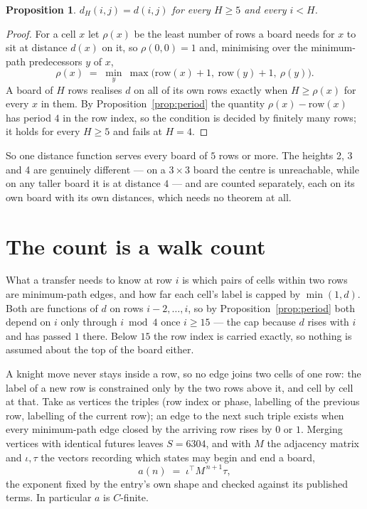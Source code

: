 \documentclass[11pt,a4paper]{article}
\theoremstyle{plain}
\newtheorem{proposition}[theorem]{Proposition}
\theoremstyle{definition}
\begin{document}
\begin{proposition}\label{prop:height}
$d_H(i,j)=d(i,j)$ for every $H\ge5$ and every $i<H$.
\end{proposition}

\begin{proof}
For a cell $x$ let $\rho(x)$ be the least number of rows a board needs for $x$ to sit at distance $d(x)$ on it, so $\rho(0,0)=1$ and, minimising over the minimum-path predecessors $y$ of $x$,
\[ \rho(x)\;=\;\min_y\ \max\bigl(\mathrm{row}(x)+1,\ \mathrm{row}(y)+1,\ \rho(y)\bigr). \]
A board of $H$ rows realises $d$ on all of its own rows exactly when $H\ge\rho(x)$ for every $x$ in them. By Proposition~\ref{prop:period} the quantity $\rho(x)-\mathrm{row}(x)$ has period $4$ in the row index, so the condition is decided by finitely many rows; it holds for every $H\ge5$ and fails at $H=4$.
\end{proof}

So one distance function serves every board of $5$ rows or more. The heights 2, 3 and 4 are genuinely different --- on a $3\times3$ board the centre is unreachable, while on any taller board it is at distance $4$ --- and are counted separately, each on its own board with its own distances, which needs no theorem at all.

\section{The count is a walk count}

What a transfer needs to know at row $i$ is which pairs of cells within two rows are minimum-path edges, and how far each cell's label is capped by $\min(1,d)$. Both are functions of $d$ on rows $i-2,\dots,i$, so by Proposition~\ref{prop:period} both depend on $i$ only through $i\bmod 4$ once $i\ge15$ --- the cap because $d$ rises with $i$ and has passed $1$ there. Below $15$ the row index is carried exactly, so nothing is assumed about the top of the board either.

A knight move never stays inside a row, so no edge joins two cells of one row: the label of a new row is constrained only by the two rows above it, and cell by cell at that. Take as vertices the triples (row index or phase, labelling of the previous row, labelling of the current row); an edge to the next such triple exists when every minimum-path edge closed by the arriving row rises by $0$ or $1$. Merging vertices with identical futures leaves $S=6304$, and with $M$ the adjacency matrix and $\iota,\tau$ the vectors recording which states may begin and end a board,
\[
a(n)\;=\;\iota^{\!\top}M^{\,n+1}\tau ,
\]
the exponent fixed by the entry's own shape and checked against its published terms. In
particular $a$ is $C$-finite.
\end{document}
